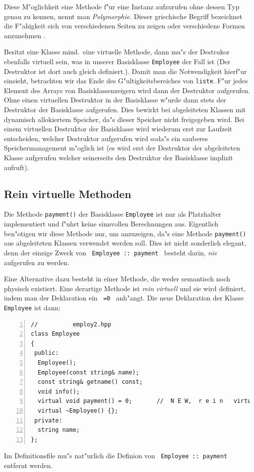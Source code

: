 Diese M"oglichkeit eine Methode f"ur eine Instanz aufzurufen ohne
dessen Typ genau zu kennen, nennt man \emph{Polymorphie}.
Dieser griechische Begriff bezeichnet die F"ahigkeit sich von verschiedenen
Seiten zu zeigen oder verschiedene Formen anzunehmen \cite[p.161]{Microsoft:1993:REC}.

Besitzt eine Klasse mind.\  eine virtuelle Methode, dann
mu"s der Destrukor ebenfalls virtuell sein, was in unserer Basisklasse
\verb|Employee| der Fall ist (Der Destruktor ist dort auch gleich definiert.).
Damit man die Notwendigkeit hierf"ur einsieht,
betrachten wir das Ende des G"ultigkeitsbereiches von \verb|liste|.
F"ur jedes Element des Arrays von Basisklassenzeigern
wird dann der Destruktor aufgerufen. Ohne einen virtuellen Destruktor in der
Basisklasse w"urde dann stets der Destruktor der Basisklasse aufgerufen.
Dies bewirkt bei abgeleiteten Klassen mit dynamisch allokiertem Speicher, da"s
dieser Speicher nicht freigegeben wird. Bei einem virtuellen
Destruktor der Basisklasse wird wiederum erst zur Laufzeit entscheiden,
welcher Destruktor aufgerufen wird soda"s ein sauberes Speichermanagement
m"oglich ist (es wird erst der Destruktor der abgeleiteten Klasse aufgerufen welcher
seinerseits den Destruktor der Basisklasse implizit aufruft).
%
%
\subsection{Rein virtuelle Methoden}
\label{sec:A2.2}
%
Die Methode \verb|payment()| der Basisklasse \verb|Employee| ist
nur als Platzhalter implementiert und f"uhrt keine sinnvollen Berechnungen aus.
Eigentlich ben"otigen wir diese Methode nur, um anzuzeigen, da"s eine
Methode \verb|payment()| aus abgeleiteten Klassen verwendet werden soll.
Dies ist nicht sonderlich elegant, denn der einzige Zweck von
\verb| Employee :: payment |  besteht darin, \emph{nie} aufgerufen zu werden.

Eine Alternative dazu besteht in einer Methode, die weder semantisch noch
physisch existiert.
Eine derartige Methode ist \emph{rein virtuell}
und sie wird definiert, indem man der Deklaration ein \verb| =0 | anh"angt.
Die neue Deklaration der Klasse \verb|Employee| ist dann:
\begin{lstlisting}[caption={Virtuelle Methoden},label=lst:virt_methode_2,
basicstyle=\scriptsize,numbers=left, numberstyle=\tiny, stepnumber=2, numbersep=5pt]
//			employ2.hpp
class Employee
{
 public:
  Employee();
  Employee(const string& name);
  const string& getname() const;
  void info();
  virtual void payment() = 0;		//  N E W,  r e i n   virtuell
  virtual ~Employee() {};
 private:
  string name;
};
\end{lstlisting}
Im Definitionsfile  mu"s nat"urlich die Definion von
\verb| Employee :: payment | entfernt werden.

